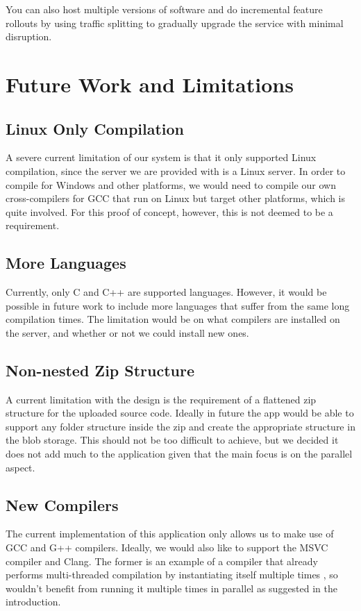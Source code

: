 \documentclass[conference]{IEEEtran}
\begin{document}
You can also host multiple versions of software and do incremental feature
rollouts by using traffic splitting to gradually upgrade the service with
minimal disruption.

\section{Future Work and Limitations}
\subsection{Linux Only Compilation}
A severe current limitation of our system is that it only supported Linux
compilation, since the server we are provided with is a Linux server. In order
to compile for Windows and other platforms, we would need to compile our own
cross-compilers for GCC that run on Linux but target other platforms, which is
quite involved. For this proof of concept, however, this is not deemed to be a
requirement.
\subsection{More Languages}
Currently, only C and C++ are supported languages. However, it would be possible
in future work to include more languages that suffer from the same long
compilation times. The limitation would be on what compilers are installed on
the server, and whether or not we could install new ones.
\subsection{Non-nested Zip Structure}
A current limitation with the design is the requirement of a flattened zip
structure for the uploaded source code. Ideally in future the app would be able
to support any folder structure inside the zip and create the appropriate
structure in the blob storage. This should not be too difficult to achieve, but
we decided it does not add much to the application given that the main focus is
on the parallel aspect.
\subsection{New Compilers}
The current implementation of this application only allows us to make use of GCC
and G++ compilers. Ideally, we would also like to support the MSVC compiler and
Clang. The former is an example of a compiler that already performs
multi-threaded compilation by instantiating itself multiple times \cite{MSVC},
so wouldn't benefit from running it multiple times in parallel as suggested in
the introduction.
\end{document}
